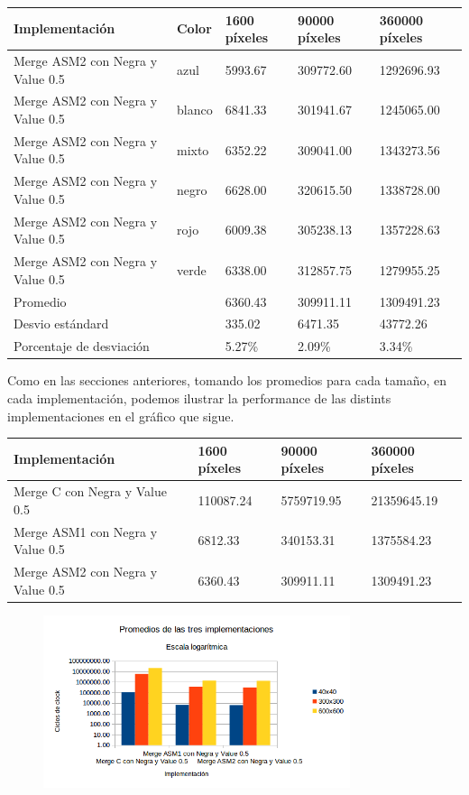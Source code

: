 \begin{tabular}{| l | l | l | l | l |}
\hline
Implementación & Color & 1600 píxeles & 90000 píxeles & 360000 píxeles\\
\hline
Merge ASM2 con Negra y Value 0.5 & azul & 5993.67	& 309772.60 & 	1292696.93\\ 
\hline
Merge ASM2 con Negra y Value 0.5 & blanco & 6841.33	& 301941.67 &	1245065.00\\ 
\hline
Merge ASM2 con Negra y Value 0.5 & mixto & 6352.22	& 309041.00	& 1343273.56\\ 
\hline
Merge ASM2 con Negra y Value 0.5 & negro & 6628.00	& 320615.50	& 1338728.00\\
\hline
Merge ASM2 con Negra y Value 0.5 & rojo & 6009.38	& 305238.13	& 1357228.63\\
\hline
Merge ASM2 con Negra y Value 0.5 & verde & 6338.00	& 312857.75	& 1279955.25\\ 
\hline
Promedio & &  6360.43	& 309911.11	& 1309491.23\\
\hline
Desvio estándard  && 335.02	& 6471.35	& 43772.26\\
\hline
Porcentaje de desviación  && 5.27\% &	2.09\% &	3.34\%\\
\hline
\end{tabular}

Como en las secciones anteriores, tomando los promedios para cada tamaño, en cada implementación, podemos ilustrar la performance de las distints implementaciones en el gráfico que sigue.

\begin{tabular}{| l | l | l | l|}
\hline
Implementación  & 1600 píxeles & 90000 píxeles & 360000 píxeles\\
\hline
Merge C con Negra y Value 0.5  & 110087.24	& 5759719.95	& 21359645.19\\
\hline
Merge ASM1 con Negra y Value 0.5  & 6812.33 &	340153.31	& 1375584.23\\
\hline
Merge ASM2 con Negra y Value 0.5 & 6360.43	& 309911.11	& 1309491.23\\
\hline
\end{tabular}

\begin{figure}[ht]
\centering
\includegraphics[width=90mm]{merge/grafico_merge_conNegras.png}
\end{figure}

